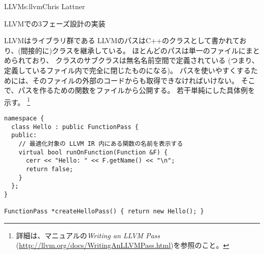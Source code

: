 \begin{aosachapter}{LLVM}{s:llvm}{Chris Lattner}
\begin{aosasect1}{LLVMでの3フェーズ設計の実装}
\begin{aosasect2}{LLVMはライブラリ群である}
LLVMのパスはC++のクラスとして書かれており、(間接的に)クラスを継承している。
ほとんどのパスは単一のファイルにまとめられており、
クラスのサブクラスは無名名前空間で定義されている
(つまり、定義しているファイル内で完全に閉じたものになる)。
パスを使いやすくするためには、そのファイルの外部のコードからも取得できなければいけない。
そこで、パスを作るための関数をファイルから公開する。
若干単純にした具体例を示す。
\footnote{詳細は、マニュアルの\emph{Writing an LLVM Pass} (\url{http://llvm.org/docs/WritingAnLLVMPass.html})を参照のこと。}


\begin{verbatim}
namespace {
  class Hello : public FunctionPass {
  public:
    // 最適化対象の LLVM IR 内にある関数の名前を表示する
    virtual bool runOnFunction(Function &F) {
      cerr << "Hello: " << F.getName() << "\n";
      return false;
    }
  };
}

FunctionPass *createHelloPass() { return new Hello(); }
\end{verbatim}


\end{aosasect2}
\end{aosasect1}
\end{aosachapter}
